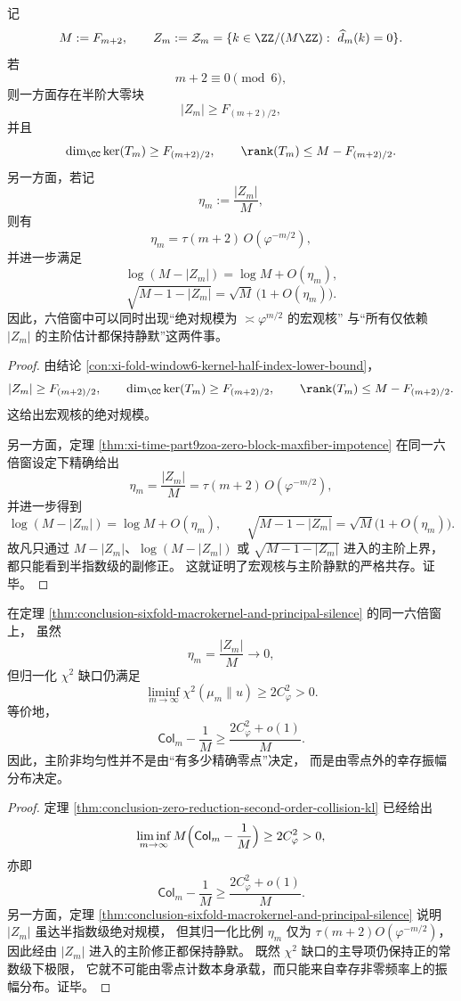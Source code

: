 \begin{theorem}[六倍窗宏观核与主阶静默的并存]\label{thm:conclusion-sixfold-macrokernel-and-principal-silence}
记
\[
M:=F_{m+2},
\qquad
Z_m:=\mathcal Z_m=\{k\in \ZZ/(M\ZZ):\ \widehat d_m(k)=0\}.
\]
若
\[
m+2\equiv 0\pmod 6,
\]
则一方面存在半阶大零块
\[
|Z_m|\ge F_{(m+2)/2},
\]
并且
\[
\dim_{\CC}\ker(T_m)\ge F_{(m+2)/2},
\qquad
\rank(T_m)\le M-F_{(m+2)/2}.
\]
另一方面，若记
\[
\eta_m:=\frac{|Z_m|}{M},
\]
则有
\[
\eta_m=\tau(m+2)\,O(\varphi^{-m/2}),
\]
并进一步满足
\[
\log(M-|Z_m|)=\log M+O(\eta_m),
\]
\[
\sqrt{M-1-|Z_m|}
=
\sqrt M\,\bigl(1+O(\eta_m)\bigr).
\]
因此，六倍窗中可以同时出现“绝对规模为 \(\asymp \varphi^{m/2}\) 的宏观核”
与“所有仅依赖 \(|Z_m|\) 的主阶估计都保持静默”这两件事。
\end{theorem}
\begin{proof}
由结论 \ref{con:xi-fold-window6-kernel-half-index-lower-bound}，
\[
|Z_m|\ge F_{(m+2)/2},
\qquad
\dim_{\CC}\ker(T_m)\ge F_{(m+2)/2},
\qquad
\rank(T_m)\le M-F_{(m+2)/2}.
\]
这给出宏观核的绝对规模。

另一方面，定理 \ref{thm:xi-time-part9zoa-zero-block-maxfiber-impotence} 在同一六倍窗设定下精确给出
\[
\eta_m=\frac{|Z_m|}{M}=\tau(m+2)\,O(\varphi^{-m/2}),
\]
并进一步得到
\[
\log(M-|Z_m|)=\log M+O(\eta_m),
\qquad
\sqrt{M-1-|Z_m|}
=
\sqrt M\bigl(1+O(\eta_m)\bigr).
\]
故凡只通过 \(M-|Z_m|\)、\(\log(M-|Z_m|)\) 或 \(\sqrt{M-1-|Z_m|}\) 进入的主阶上界，
都只能看到半指数级的副修正。
这就证明了宏观核与主阶静默的严格共存。证毕。
\end{proof}

\begin{corollary}[主阶碰撞缺口由幸存振幅分布而非零点计数支配]\label{cor:conclusion-collision-gap-controlled-by-surviving-amplitudes-not-zero-counts}
在定理 \ref{thm:conclusion-sixfold-macrokernel-and-principal-silence} 的同一六倍窗上，
虽然
\[
\eta_m=\frac{|Z_m|}{M}\to 0,
\]
但归一化 \(\chi^2\) 缺口仍满足
\[
\liminf_{m\to\infty}\chi^2(\mu_m\|u)\ge 2C_\varphi^2>0.
\]
等价地，
\[
\mathsf{Col}_m-\frac1M \ge \frac{2C_\varphi^2+o(1)}{M}.
\]
因此，主阶非均匀性并不是由“有多少精确零点”决定，
而是由零点外的幸存振幅分布决定。
\end{corollary}
\begin{proof}
定理 \ref{thm:conclusion-zero-reduction-second-order-collision-kl} 已经给出
\[
\liminf_{m\to\infty}M\Bigl(\mathsf{Col}_m-\frac1M\Bigr)\ge 2C_\varphi^2>0,
\]
亦即
\[
\mathsf{Col}_m-\frac1M \ge \frac{2C_\varphi^2+o(1)}{M}.
\]
另一方面，定理 \ref{thm:conclusion-sixfold-macrokernel-and-principal-silence} 说明
\(|Z_m|\) 虽达半指数级绝对规模，
但其归一化比例 \(\eta_m\) 仅为 \(\tau(m+2)O(\varphi^{-m/2})\)，
因此经由 \(|Z_m|\) 进入的主阶修正都保持静默。
既然 \(\chi^2\) 缺口的主导项仍保持正的常数级下极限，
它就不可能由零点计数本身承载，而只能来自幸存非零频率上的振幅分布。证毕。
\end{proof}

